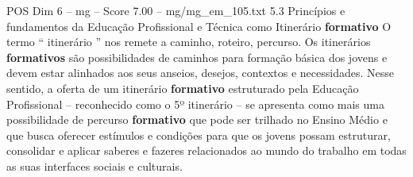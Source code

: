 \begin{textsample}{POS Dim 6 – mg – Score 7.00 – mg/mg\_em\_105.txt}  \label{ex:f6_pos_245}
5.3 Princípios e fundamentos da Educação Profissional e Técnica como Itinerário \textbf{formativo} O termo “ itinerário ” nos remete a caminho, roteiro, percurso.
Os itinerários \textbf{formativos} são possibilidades de caminhos para formação básica dos jovens e devem estar alinhados aos seus anseios, desejos, contextos e necessidades.
Nesse sentido, a oferta de um itinerário \textbf{formativo} estruturado pela Educação Profissional – reconhecido como o 5º itinerário – se apresenta como mais uma possibilidade de percurso \textbf{formativo} que pode ser trilhado no Ensino Médio e que busca oferecer estímulos e condições para que os jovens possam estruturar, consolidar e aplicar saberes e fazeres relacionados ao mundo do trabalho em todas as suas interfaces sociais e culturais.

\end{textsample}
